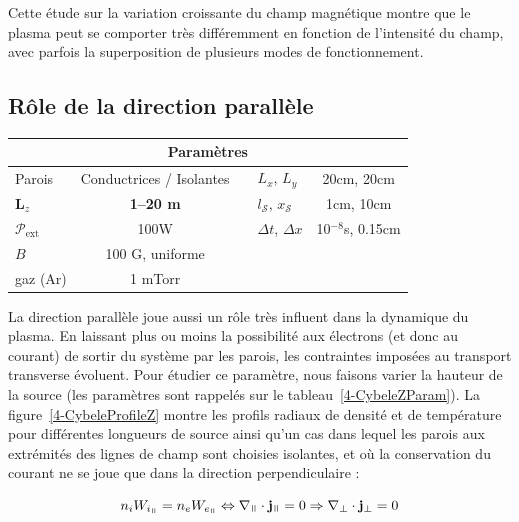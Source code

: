 \begin{refsection}
Cette étude sur la variation croissante du champ magnétique montre 
que le plasma peut se comporter très différemment en fonction de
l'intensité du champ, avec parfois la superposition de plusieurs modes de
fonctionnement.

\subsection{Rôle de la direction parallèle}
\begin{minipage}{\textwidth}
\footnotesize\centering
{}
\begin{tabular}{lcclc}\toprule
\multicolumn{5}{c}{\bf Paramètres}\\
\midrule 
Parois & Conductrices / Isolantes &&$L_x$, $L_y$  & 20cm, 20cm\\
\textbf{L}$_z$& \textbf{1--20 m}&&$l_\mathcal{S}$, $x_\mathcal{S}$&1cm, 10cm\\
$\mathcal{P}_\text{ext}$&100W&&$\Delta t$, $\Delta x$&10$^{-8}$s,
0.15cm\\
$B$ & 100 G, uniforme&&&\\
gaz (Ar) & 1 mTorr&&&\\
\bottomrule
\end{tabular}
\label{4-CybeleZParam}
\end{minipage}	

La direction parallèle joue aussi un rôle très influent dans la
dynamique du plasma. En laissant plus ou moins la possibilité aux électrons (et
donc au courant) de sortir du système par les parois, les contraintes imposées
au transport transverse évoluent. Pour étudier ce paramètre, nous faisons
varier la hauteur de la source (les paramètres sont rappelés sur le
tableau~\ref{4-CybeleZParam}). La figure~\ref{4-CybeleProfileZ} montre les
profils radiaux de densité et de température pour différentes longueurs de source ainsi qu'un cas dans lequel les parois aux extrémités des lignes de champ sont choisies isolantes, et où la conservation du courant ne se joue que dans la
direction perpendiculaire :

\begin{equation}
n_iW_{i_\para}=n_eW_{e_\para}\Leftrightarrow\nabla_\para\cdot\mathbf j_\para = 0
\Rightarrow \nabla_\perp\cdot\mathbf j_\perp = 0
\end{equation}


\end{refsection}
